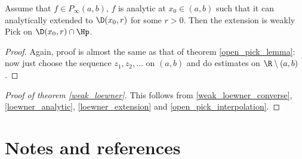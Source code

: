 \begin{lem}\label{loewner_extension}
	Assume that $f \in P_{\infty}(a, b)$, $f$ is analytic at $x_{0} \in (a, b)$ such that it can analytically extended to $\D(x_{0}, r)$ for some $r > 0$. Then the extension is weakly Pick on $\D(x_{0}, r) \cap \Hp$.
\end{lem}
\begin{proof}
	Again, proof is almost the same as that of theorem \ref{open_pick_lemma}: now just choose the sequence $z_{1}, z_{2}, \ldots$ on $(a, b)$ and do estimates on $\R \setminus (a, b)$.
\end{proof}

\begin{proof}[Proof of theorem \ref{weak_loewner}]
	This follows from \ref{weak_loewner_converse}, \ref{loewner_analytic}, \ref{loewner_extension} and \ref{open_pick_interpolation}.
\end{proof}

\section{Notes and references}

